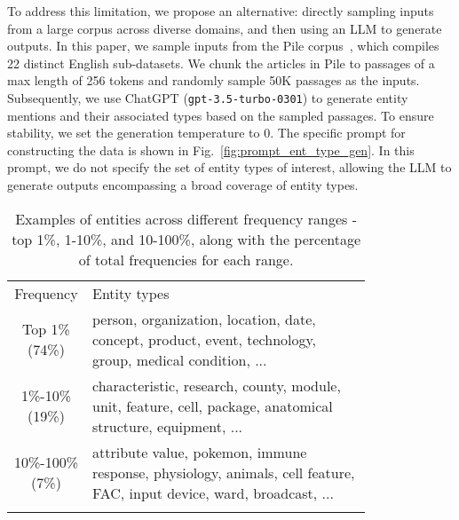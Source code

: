To address this limitation, we propose an alternative: directly sampling inputs from a large corpus across diverse domains, and then using an LLM to generate outputs.
In this paper, we sample inputs from the Pile corpus~\citep{gao2020pile}, which compiles 22 distinct English sub-datasets.
We chunk the articles in Pile to passages of a max length of 256 tokens and randomly sample 50K passages as the inputs.
Subsequently, we use ChatGPT (\texttt{gpt-3.5-turbo-0301}) to generate entity mentions and their associated types based on the sampled passages.
To ensure stability, we set the generation temperature to 0.
The specific prompt for constructing the data is shown in Fig.~\ref{fig:prompt_ent_type_gen}.
In this prompt, we do not specify the set of entity types of interest, allowing the LLM to generate outputs encompassing a broad coverage of entity types.

\begin{table}[!t]
    \centering
    \small
    \begin{tabular}{c|p{0.8\linewidth}}
        \shline
         Frequency&  Entity types\\
         \shline
         \makecell[tc]{Top 1\% \\ (74\%)} & person, organization, location, date, concept, product, event, technology, group, medical condition, ...\\
         \shline
         \makecell[tc]{1\%-10\% \\ (19\%)}& characteristic, research, county, module, unit, feature, cell, package, anatomical structure, equipment, ... \\
         \shline
         \makecell[tc]{10\%-100\% \\ (7\%)}& attribute value, pokemon, immune response, physiology, animals, cell feature, FAC, input device, ward, broadcast, ... \\
         \shline
    \end{tabular}
    \caption{Examples of entities across different frequency ranges - top 1\%, 1-10\%, and 10-100\%, along with the percentage of total frequencies for each range.}
    \label{tab:entity_types}
\end{table}

